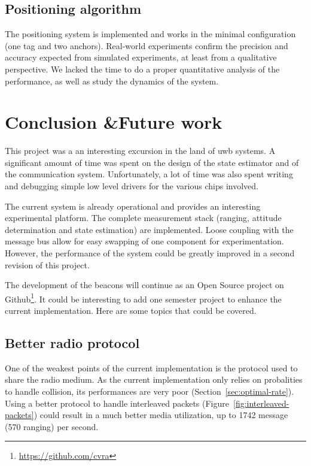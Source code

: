 \documentclass[a4paper, 12pt]{scrreprt}
\begin{document}
\section{Positioning algorithm}
The positioning system is implemented and works in the minimal configuration (one tag and two anchors).
Real-world experiments confirm the precision and accuracy expected from simulated experiments, at least from a qualitative perspective.
We lacked the time to do a proper quantitative analysis of the performance, as well as study the dynamics of the system.

\chapter{Conclusion \&Future work}

This project was a an interesting excursion in the land of \gls{uwb} systems.
A significant amount of time was spent on the design of the state estimator and of the communication system.
Unfortunately, a lot of time was also spent writing and debugging simple low level drivers for the various chips involved.

The current system is already operational and provides an interesting experimental platform.
The complete measurement stack (ranging, attitude determination and state estimation) are implemented.
Loose coupling with the message bus allow for easy swapping of one component for experimentation.
However, the performance of the system could be greatly improved in a second revision of this project.

The development of the beacons will continue as an Open Source project on Github\footnote{\url{https://github.com/cvra}}.
It could be interesting to add one semester project to enhance the current implementation.
Here are some topics that could be covered.

\section{Better radio protocol}

One of the weakest points of the current implementation is the protocol used to share the radio medium.
As the current implementation only relies on probalities to handle collision, its performances are very poor (Section~\ref{sec:optimal-rate}).
Using a better protocol to handle interleaved packets (Figure~\ref{fig:interleaved-packets}) could result in a much better media utilization, up to 1742 message (570 ranging) per second\cite{dw1000manual}.
\end{document}
